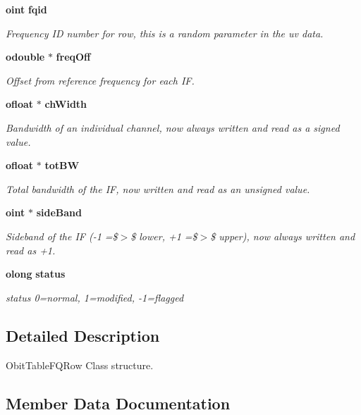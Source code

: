 \begin{CompactItemize}
{\bf oint} {\bf fqid}
\begin{CompactList}\small\item\em Frequency ID number for row, this is a random parameter in the uv data. \item\end{CompactList}\item 
{\bf odouble} $\ast$ {\bf freq\-Off}
\begin{CompactList}\small\item\em Offset from reference frequency for each IF. \item\end{CompactList}\item 
{\bf ofloat} $\ast$ {\bf ch\-Width}
\begin{CompactList}\small\item\em Bandwidth of an individual channel, now always written and read as a signed value. \item\end{CompactList}\item 
{\bf ofloat} $\ast$ {\bf tot\-BW}
\begin{CompactList}\small\item\em Total bandwidth of the IF, now written and read as an unsigned value. \item\end{CompactList}\item 
{\bf oint} $\ast$ {\bf side\-Band}
\begin{CompactList}\small\item\em Sideband of the IF (-1 =\$$>$\$ lower, +1 =\$$>$\$ upper), now always written and read as +1. \item\end{CompactList}\item 
{\bf olong} {\bf status}
\begin{CompactList}\small\item\em status 0=normal, 1=modified, -1=flagged \item\end{CompactList}\end{CompactItemize}


\subsection{Detailed Description}
Obit\-Table\-FQRow Class structure. 



\subsection{Member Data Documentation}
